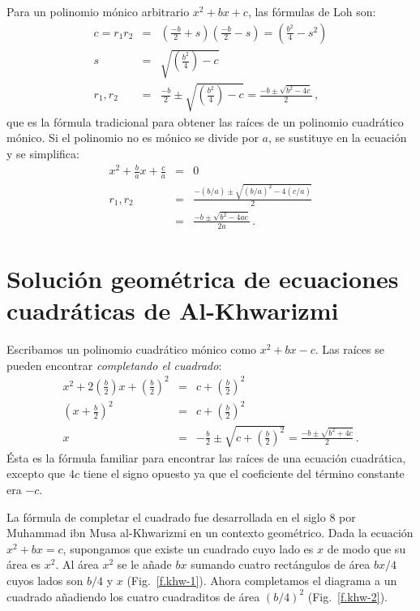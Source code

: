 Para un polinomio mónico arbitrario $x^2+bx+c$, las fórmulas de Loh son:
\begin{eqnarray*}
c=r_1r_2&=&\left(\frac{-b}{2}+s\right)  \left(\frac{-b}{2}-s\right)=\left(\frac{b^2}{4}-s^2\right)\\
s&=&\sqrt{\left(\frac{b^2}{4}\right)-c}\\
r_1,r_2&=&\frac{-b}{2}\pm\sqrt{\left(\frac{b^2}{4}\right)-c}=\frac{-b\pm\sqrt{b^2-4c}}{2}\,,
\end{eqnarray*}
que es la fórmula tradicional para obtener las raíces de un polinomio cuadrático mónico. Si el polinomio no es mónico se divide por $a$, se sustituye en la ecuación y se simplifica:
\begin{eqnarray*}
x^2+\frac{b}{a}x+\frac{c}{a}&=&0\\
r_1,r_2&=&\frac{-(b/a)\pm\sqrt{(b/a)^2-4(c/a)}}{2}\\
&=&\frac{-b\pm\sqrt{b^2-4ac}}{2a}\,.
\end{eqnarray*}

\section{Solución geométrica de ecuaciones cuadráticas de Al-Khwarizmi}\label{s.khwar}

Escribamos un polinomio cuadrático mónico como $x^2+bx-c$. Las raíces se pueden encontrar \emph{completando el cuadrado}:
\begin{eqnarray*}
x^2+2\left(\frac{b}{2}\right)x+\left(\frac{b}{2}\right)^2&=&c+\left(\frac{b}{2}\right)^2\\
\left(x+\frac{b}{2}\right)^2&=&c+\left(\frac{b}{2}\right)^2\\
x&=&-\frac{b}{2}\pm\sqrt{c+\left(\frac{b}{2}\right)^2}=
\frac{-b\pm\sqrt{b^2+4c}}{2}\,.
\end{eqnarray*}
Ésta es la fórmula familiar para encontrar las raíces de una ecuación cuadrática, excepto que $4c$ tiene el signo opuesto ya que el coeficiente del término constante era $-c$.

La fórmula de completar el cuadrado fue desarrollada en el siglo $8$ por Muhammad ibn Musa al-Khwarizmi en un contexto geométrico. Dada la ecuación $x^2+bx=c$, supongamos que existe un cuadrado cuyo lado es 
$x$ de modo que su área es $x^2$.
Al área $x^2$ se le añade $bx$ sumando cuatro rectángulos de área $bx/4$ cuyos lados son $b/4$ y $x$ (Fig.~\ref{f.khw-1}). Ahora completamos el diagrama a un cuadrado añadiendo los cuatro cuadraditos de área $(b/4)^2$ (Fig.~\ref{f.khw-2}).

